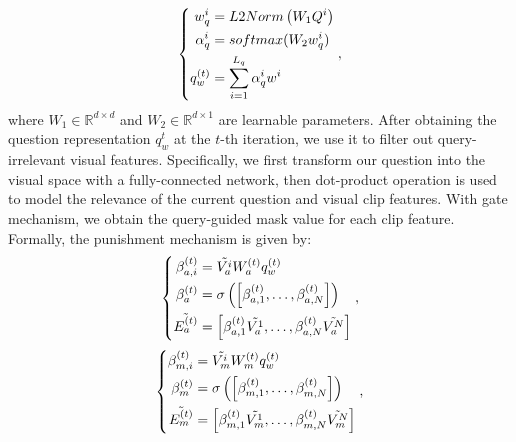 \documentclass[journal]{IEEEtran}
\begin{document}
\allowdisplaybreaks[4]
\begin{align}
\left\{
\allowdisplaybreaks[4]
    \begin{aligned}
        w^i_q & = L2Norm\left(W_{1}Q^i\right) \\
        \alpha^i_q & = softmax(W_{2}w^i_q) \\
        q^{\left(t\right)}_w & = \sum_{i=1}^{L_q} \alpha^i_q w^i
    \end{aligned}
   \right.,
\end{align}
where $W_1 \in \mathbb{R}^{d \times d}$ and $W_2 \in \mathbb{R}^{d \times 1}$ are learnable parameters. 
After obtaining the question representation $q^{t}_w$ at the $t$-th iteration, we use it to filter out query-irrelevant visual features. Specifically, we first transform our question into the visual space with a fully-connected network, then dot-product operation is used to model the relevance of the current question and visual clip features. With gate mechanism, we obtain the query-guided mask value for each clip feature. Formally, the punishment mechanism is given by:
\begin{equation}
\left\{
    \begin{aligned}
        \beta_{a,i}^{\left(t\right)} & = \Tilde{V^i_a} W^{\left(t\right)}_a q^{\left(t\right)}_w \\
        \beta_{a}^{\left(t\right)} & = \sigma \left(\left[\beta_{a,1}^{\left(t\right)}, \dots, \beta_{a,N}^{\left(t\right)}\right]\right)\\
        \Tilde{E^{(t)}_a} & = \left[\beta_{a,1}^{\left(t\right)}\Tilde{V^1_a}, \dots, \beta_{a,N}^{\left(t\right)}\Tilde{V^N_a}\right]\\
    \end{aligned}
    \right.,
\end{equation}
\begin{equation}
\left\{
    \begin{aligned}
        \beta_{m,i}^{\left(t\right)} & = \Tilde{V^i_m} W^{\left(t\right)}_m q^{\left(t\right)}_w \\
        \beta_{m}^{\left(t\right)} & = \sigma
        \left(\left[\beta_{m,1}^{\left(t\right)}, \dots, \beta_{m,N}^{\left(t\right)}\right]\right)\\
        \Tilde{E^{(t)}_m} & = \left[\beta_{m,1}^{\left(t\right)}\Tilde{V^1_m}, \dots, \beta_{m,N}^{\left(t\right)}\Tilde{V^N_m}\right]\\
    \end{aligned}
    \right.,
\end{equation}
\end{document}
